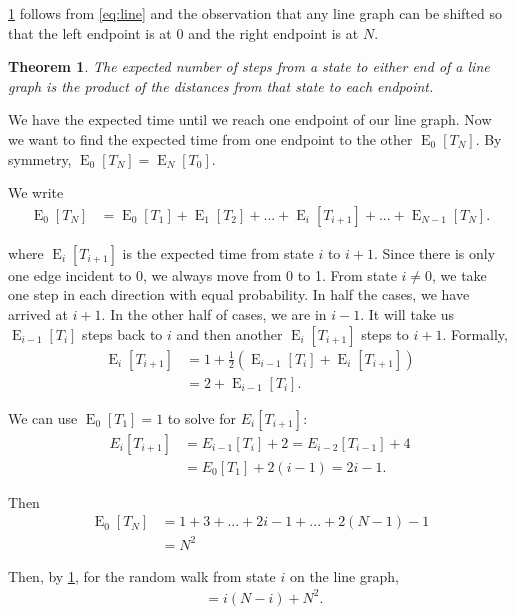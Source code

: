 \documentclass[12pt]{article}
\newtheorem{theorem}{Theorem}
\theoremstyle{definition}
\DeclareMathOperator{\E}{\mathrm{E}}		%
\DeclareMathOperator{\cov}{t_\textrm{cov}}  %
\begin{document}
\cref{thm:line} follows from \cref{eq:line} and the observation that any
line graph can be shifted so that the left endpoint
is at $0$ and the right endpoint is at $N$.

\begin{theorem}
The expected number of steps from a state to either end of a line graph
is the product of the distances from that state to each endpoint.
\label{thm:line}
\end{theorem}

We have the expected time until we reach one endpoint of our line graph.
Now we want to find the expected time from one endpoint to the other $\E_0[T_N]$.
By symmetry, $\E_0[T_N] = \E_N[T_0]$.

We write
\begin{align}
\E_0[T_N] &= \E_0[T_1] + \E_1[T_2] + ... + \E_{i}[T_{i+1}] + ... + \E_{N-1}[T_N]. \nonumber
\end{align}

where $\E_{i}[T_{i+1}]$ is the expected time from state $i$ to $i+1$.
Since there is only one edge incident to 0, we always move from 0 to 1.
From state $i\neq0$, we take one step in each direction with equal probability.
In half the cases, we have arrived at $i+1$.
In the other half of cases, we are in $i-1$.
It will take us $\E_{i-1}[T_i]$ steps back to $i$ and then another
$\E_i[T_{i+1}]$ steps to $i+1$.
Formally,
\begin{align}
\E_{i}[T_{i+1}] &= 1 + \frac{1}{2}(\E_{i-1}[T_i]+\E_i[T_{i+1}]) \nonumber \\
 &= 2 + \E_{i-1}[T_{i}]. \nonumber
\end{align}

We can use $\E_0[T_1] = 1$ to solve for $E_i[T_{i+1}]$:
\begin{align}
E_i[T_{i+1}] &= E_{i-1}[T_{i}] + 2 = E_{i-2}[T_{i-1}] + 4 \nonumber\\
 &= E_0[T_1] + 2(i-1) = 2i - 1. \nonumber
\end{align}

Then
\begin{align}
\E_0[T_N] &= 1 + 3 + ... + 2i - 1 + ... + 2(N-1) -1 \nonumber \\
&= N^2 \nonumber
\end{align}

Then, by \cref{thm:line}, for the random walk from state $i$ on the line graph,
\begin{align}
\cov = i(N-i) + N^2. \nonumber
\end{align}
\end{document}
